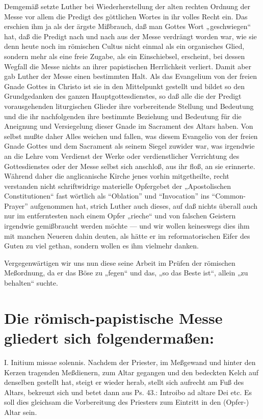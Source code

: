 Demgemäß setzte Luther bei Wiederherstellung der alten rechten Ordnung der Messe vor allem die Predigt des göttlichen Wortes in ihr volles Recht ein. Das erschien ihm ja als der ärgste Mißbrauch, daß man Gottes Wort „geschwiegen“ hat, daß die Predigt nach und nach aus der Messe verdrängt worden war, wie sie denn heute noch im römischen Cultus nicht einmal als ein organisches Glied, sondern mehr als eine freie Zugabe, als ein Einschiebsel, erscheint, bei dessen Wegfall die Messe nichts an ihrer papistischen Herrlichkeit verliert. Damit aber gab Luther der Messe einen bestimmten Halt. Als das Evangelium von der freien Gnade Gottes in Christo ist sie in den Mittelpunkt gestellt und bildet so den Grundgedanken des ganzen Hauptgottesdienstes, so daß alle die der Predigt vorausgehenden liturgischen Glieder ihre vorbereitende Stellung und Bedeutung und die ihr nachfolgenden ihre bestimmte Beziehung und Bedeutung für die Aneignung und Versiegelung dieser Gnade im Sacrament des Altars haben. Von selbst mußte daher Alles weichen und fallen, was diesem Evangelio von der freien Gnade Gottes und dem Sacrament als seinem Siegel zuwider war, was irgendwie an die Lehre vom Verdienst der Werke oder verdienstlicher Verrichtung des Gottesdienstes oder der Messe selbst sich anschloß, aus ihr floß, an sie erinnerte. Während daher die anglicanische Kirche jenes vorhin mitgetheilte, recht verstanden nicht schriftwidrige materielle Opfergebet der „Apostolischen Constitutionen“ fast wörtlich als “Oblation” und “Invocation” ins “Common-Prayer” aufgenommen hat, strich Luther auch dieses, auf daß nichts überall auch nur im entferntesten nach einem Opfer „rieche“ und von falschen Geistern irgendwie gemißbraucht werden möchte — und wir wollen keineswegs dies ihm mit manchen Neueren dahin deuten, als hätte er im reformatorischen Eifer des Guten zu viel gethan, sondern wollen es ihm vielmehr danken.

Vergegenwärtigen wir uns nun diese seine Arbeit im Prüfen der römischen Meßordnung, da er das Böse zu „fegen“ und das, „so das Beste ist“, allein „zu behalten“ suchte.

\section[Die römisch-papistische Messe]{Die römisch-papistische Messe gliedert sich folgendermaßen:}

I. Initium missae solennis. Nachdem der Priester, im Meßgewand und hinter den Kerzen tragenden Meßdienern, zum Altar gegangen und den bedeckten Kelch auf denselben gestellt hat, steigt er wieder herab, stellt sich aufrecht am Fuß des Altars, bekreuzt sich und betet dann aus Ps. 43.: Introibo ad altare Dei etc. Es soll dies gleichsam die Vorbereitung des Priesters zum Eintritt in den (Opfer-) Altar sein.

